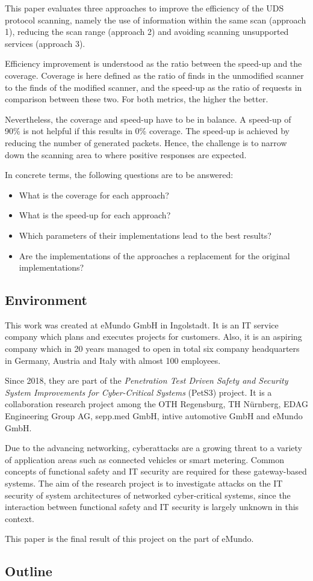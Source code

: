 This paper evaluates three approaches to improve the efficiency of the UDS protocol scanning, namely the use of information within the same scan (approach 1), reducing the scan range (approach 2) and avoiding scanning unsupported services (approach 3).

Efficiency improvement is understood as the ratio between the speed-up and the coverage. Coverage is here defined as the ratio of finds in the unmodified scanner to the finds of the modified scanner, and the speed-up as the ratio of requests in comparison between these two. For both metrics, the higher the better.

Nevertheless, the coverage and speed-up have to be in balance. A speed-up of 90\% is not helpful if this results in 0\% coverage. The speed-up is achieved by reducing the number of generated packets. Hence, the challenge is to narrow down the scanning area to where positive responses are expected.

In concrete terms, the following questions are to be answered:

\begin{itemize}
    \item What is the coverage for each approach?
    \item What is the speed-up for each approach?
    \item Which parameters of their implementations lead to the best results?
    \item Are the implementations of the approaches a replacement for the original implementations?
\end{itemize}


\subsection{Environment}
This work was created at eMundo GmbH in Ingolstadt. It is an IT service company which plans and executes projects for customers. Also, it is an aspiring company which in 20 years managed to open in total six company headquarters in Germany, Austria and Italy with almost 100 employees.

Since 2018, they are part of the \emph{Penetration Test Driven Safety and Security System Improvements for Cyber-Critical Systems} (PetS3) project. It is a collaboration research project among the OTH Regensburg, TH Nürnberg, EDAG Engineering Group AG, sepp.med GmbH, intive automotive GmbH and eMundo GmbH.

Due to the advancing networking, cyberattacks are a growing threat to a variety of application areas such as connected vehicles or smart metering. Common concepts of functional safety and IT security are required for these gateway-based systems. The aim of the research project is to investigate attacks on the IT security of system architectures of networked cyber-critical systems, since the interaction between functional safety and IT security is largely unknown in this context.

This paper is the final result of this project on the part of eMundo.

\subsection{Outline}
